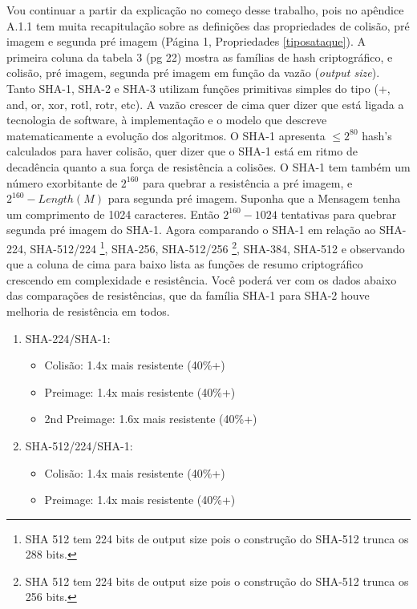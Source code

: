 \documentclass[12pt, a4paper]{article}
\begin{document}
\begin{enumerate}
\begin{enumerate}
Vou continuar a partir da explicação no começo desse trabalho, pois no apêndice
A.1.1 tem muita recapitulação sobre as definições das propriedades de colisão,
pré imagem e segunda pré imagem (Página 1, Propriedades \ref{tiposataque}). A
primeira coluna da tabela 3 (pg 22) mostra as famílias de hash criptográfico, e
colisão, pré imagem, segunda pré imagem em função da vazão (\textit{output
size}). Tanto SHA-1, SHA-2 e SHA-3 utilizam funções primitivas simples do tipo
(+, and, or, xor, rotl, rotr, etc). A vazão crescer de cima quer dizer que está
ligada a tecnologia de software, à implementação e o modelo que descreve
matematicamente a evolução dos algoritmos. O SHA-1 apresenta $\le 2^{80}$ hash's
calculados para haver colisão, quer dizer que o SHA-1 está em ritmo de
decadência quanto a sua força de resistência a colisões. O SHA-1 tem também um
número exorbitante de $2^{160}$ para quebrar a resistência a pré imagem, e
$2^{160}-Length(M)$ para segunda pré imagem. Suponha que a Mensagem tenha um
comprimento de 1024 caracteres. Então $2^{160} - 1024$ tentativas para quebrar
segunda pré imagem do SHA-1. Agora comparando o SHA-1 em relação ao SHA-224,
SHA-512/224 \footnote{SHA 512 tem 224 bits de output size pois o construção do
SHA-512 trunca os 288 bits.}, SHA-256, SHA-512/256 \footnote{SHA 512 tem 224
bits de output size pois o construção do SHA-512 trunca os 256 bits.}, SHA-384,
SHA-512 e observando que a coluna de cima para baixo lista as funções de resumo
criptográfico crescendo em complexidade e resistência. Você poderá ver com
os dados abaixo das comparações de resistências, que da família SHA-1 para
SHA-2 houve melhoria de resistência em todos.\\

\begin{enumerate}
\item SHA-224/SHA-1:
 \begin{itemize}
 \item Colisão: 1.4x mais resistente (40\%+)

 \item Preimage: 1.4x mais resistente (40\%+)

 \item 2nd Preimage: 1.6x mais resistente (40\%+)
 \end{itemize}
\item SHA-512/224/SHA-1:
 \begin{itemize}
 \item Colisão: 1.4x mais resistente (40\%+)

 \item Preimage: 1.4x mais resistente (40\%+)


\end{itemize}
\end{enumerate}
\end{enumerate}
\end{enumerate}
\end{document}
